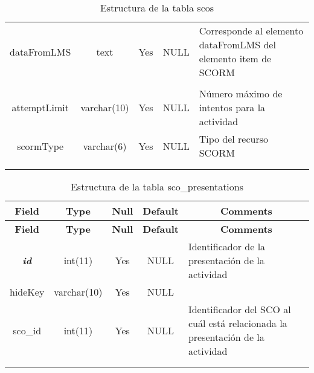 \begin{longtable}{c c c c l}
	dataFromLMS & text & Yes & NULL & \parbox[t]{0.35\textwidth}{Corresponde al elemento dataFromLMS del elemento item de SCORM} \\ \\  \hline
	attemptLimit & varchar(10) & Yes & NULL & \parbox[t]{0.35\textwidth}{Número máximo de intentos para la actividad}\\ \hline 
	scormType & varchar(6) & Yes & NULL & \parbox[t]{0.35\textwidth}{Tipo del recurso SCORM}\\ \hline \\
\caption{Estructura de la tabla scos} \label{tab:scorm_scos-structure} \\
\end{longtable}

%
%
\begin{longtable}{c c c c l}
	\multicolumn{1}{c}{\textbf{Field}} &
	\multicolumn{1}{c}{\textbf{Type}} &
	\multicolumn{1}{c}{\textbf{Null}} &
	\multicolumn{1}{c}{\textbf{Default}} &
	\multicolumn{1}{c}{\textbf{Comments}} \\ \hline \hline
\endfirsthead
	\multicolumn{1}{c}{\textbf{Field}} &
	\multicolumn{1}{c}{\textbf{Type}} &
	\multicolumn{1}{c}{\textbf{Null}} &
	\multicolumn{1}{c}{\textbf{Default}} &
	\multicolumn{1}{c}{\textbf{Comments}} \\ \hline \hline
\endhead \endfoot
	\textbf{\textit{id}} & int(11) & Yes & NULL & \parbox[t]{0.35\textwidth}{Identificador de la presentación de la actividad} \\ \hline 
	hideKey & varchar(10) & Yes & NULL \\ \hline 
	sco\_id & int(11) & Yes & NULL & \parbox[t]{0.35\textwidth}{Identificador del SCO al cuál está relacionada la presentación de la actividad}\\ \hline \\ 
 \caption{Estructura de la tabla sco\_presentations} \label{tab:scorm_sco_presentations-structure} \\
\end{longtable}


